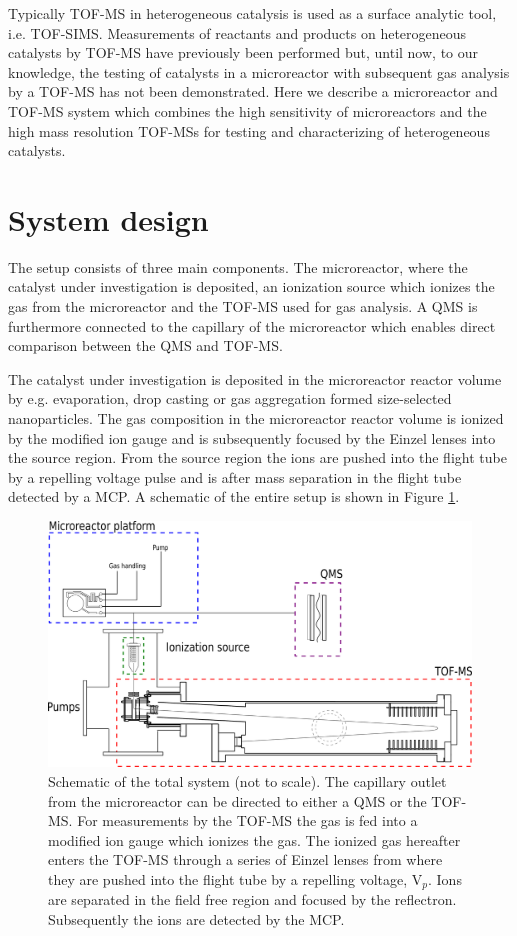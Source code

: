 \documentclass[aip,rsi]{revtex4-1}
\begin{document}
Typically TOF-MS in heterogeneous catalysis is used as a surface analytic tool, i.e. TOF-SIMS\cite{Benninghoven1994,DeSmet1998,Grams2004,Johnson2010}. Measurements of reactants and products on heterogeneous catalysts by TOF-MS have previously been performed\cite{Levy1963,Okumura2007} but, until now, to our knowledge, the testing of catalysts in a microreactor with subsequent gas analysis by a TOF-MS has not been demonstrated. Here we describe a microreactor and TOF-MS system which combines the high sensitivity of microreactors and the high mass resolution TOF-MSs for testing and characterizing of heterogeneous catalysts.

\section{System design}
The setup consists of three main components. The microreactor, where the catalyst under investigation is deposited, an ionization source which ionizes the gas from the microreactor and the TOF-MS used for gas analysis. A QMS is furthermore connected to the capillary of the microreactor which enables direct comparison between the QMS and TOF-MS.

The catalyst under investigation is deposited in the microreactor reactor volume by e.g. evaporation\cite{Henriksen2009}, drop casting\cite{Vesborg2010} or gas aggregation formed size-selected nanoparticles. The gas composition in the microreactor reactor volume is ionized by the modified ion gauge  and is subsequently focused by the Einzel lenses into the source region. From the source region the ions are pushed into the flight tube by a repelling voltage pulse and is after mass separation in the flight tube detected by a MCP. A schematic of the entire setup is shown in Figure \ref{fig:TOF_microreactor}.
\begin{figure}
 \includegraphics[width=14cm]{TOF_microreactor.png}%
 \caption{Schematic of the total system (not to scale). The capillary outlet from the microreactor can be directed to either a QMS or the TOF-MS. For measurements by the TOF-MS the gas is fed into a modified ion gauge which ionizes the gas. The ionized gas hereafter enters the TOF-MS through a series of Einzel lenses from where they are pushed into the flight tube by a repelling voltage, V$_p$. Ions are separated in the field free region and focused by the reflectron. Subsequently the ions are detected by the MCP.\label{fig:TOF_microreactor}}%
\end{figure}
\end{document}
